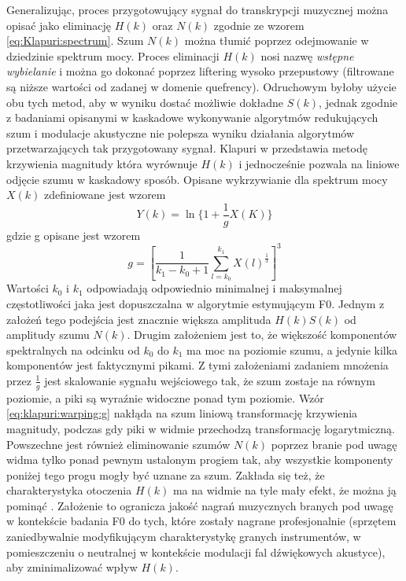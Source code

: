 \documentclass[12pt,a4paper,twoside]{mwart}
\begin{document}
Generalizując, proces przygotowujący sygnał do transkrypcji muzycznej można opisać jako eliminację $H(k)$ oraz $N(k)$ zgodnie ze wzorem \ref{eq:Klapuri:spectrum}. Szum $N(k)$ można tłumić poprzez odejmowanie w dziedzinie spektrum mocy. Proces eliminacji $H(k)$ nosi nazwę \textit{wstępne wybielanie} i można go dokonać poprzez liftering wysoko przepustowy (filtrowane są niższe wartości od zadanej w domenie quefrency). Odruchowym byłoby użycie obu tych metod, aby w wyniku dostać możliwie dokładne $S(k)$, jednak zgodnie z badaniami opisanymi w \cite[85-86]{Transcription:Hermansky:RecognitionInNoise} kaskadowe wykonywanie algorytmów redukujących szum i modulacje akustyczne nie polepsza wyniku działania algorytmów przetwarzających tak przygotowany sygnał. Klapuri w \cite[806]{Transcription:Klapuri:MultipleFundamentalFrequencyEstimation} przedstawia metodę krzywienia magnitudy która wyrównuje $H(k)$ i jednocześnie pozwala na liniowe odjęcie szumu w kaskadowy sposób. Opisane wykrzywianie dla spektrum mocy $X(k)$ zdefiniowane jest wzorem
\begin{equation}\label{eq:klapuri:warping}
  Y(k) = \ln\{ 1 + \frac{1}{g}X(K)\}
\end{equation}
gdzie g opisane jest wzorem
\begin{equation}\label{eq:klapuri:warping:g}
  g = [ \frac{1}{k_1 - k_0 + 1} \sum_{l=k_0}^{k_1}X(l)^{\frac{1}{3}}]^3
\end{equation}
Wartości $k_0$ i $k_1$ odpowiadają odpowiednio minimalnej i maksymalnej częstotliwości jaka jest dopuszczalna w algorytmie estymującym F0. Jednym z założeń tego podejścia jest znacznie większa amplituda $H(k)S(k)$ od amplitudy szumu $N(k)$. Drugim założeniem jest to, że większość komponentów spektralnych na odcinku od $k_0$ do $k_1$  ma moc na poziomie szumu, a jedynie kilka komponentów jest faktycznymi pikami. Z tymi założeniami zadaniem mnożenia przez $\frac{1}{g}$ jest skalowanie sygnału wejściowego tak, że szum zostaje na równym poziomie, a piki są wyraźnie widoczne ponad tym poziomie. Wzór \ref{eq:klapuri:warping:g} nakłąda na szum liniową transformację krzywienia magnitudy, podczas gdy piki w widmie przechodzą transformację logarytmiczną. Powszechne jest również eliminowanie szumów $N(k)$ poprzez branie pod uwagę widma tylko ponad pewnym ustalonym progiem tak, aby wszystkie komponenty poniżej tego progu mogły być uznane za szum. Zakłada się też, że charakterystyka otoczenia $H(k)$ ma na widmie na tyle mały efekt, że można ją pominąć \cite{Transcription:Pertus:Inharmonicity}. Założenie to ogranicza jakość nagrań muzycznych branych pod uwagę w kontekście badania F0 do tych, które zostały nagrane profesjonalnie (sprzętem zaniedbywalnie modyfikującym charakterystykę granych instrumentów, w pomieszczeniu o neutralnej w kontekście modulacji fal dźwiękowych akustyce), aby zminimalizować wpływ $H(k)$.
\end{document}
